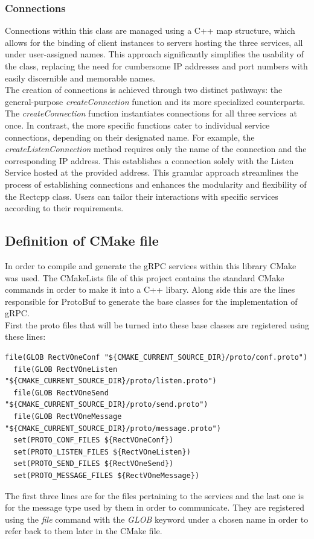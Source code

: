 \subsubsection{Connections}
Connections within this class are managed using a C++ map structure, which allows for the binding of client instances to servers hosting the three services, 
all under user-assigned names. This approach significantly simplifies the usability of the class, replacing the need for cumbersome IP addresses and port 
numbers with easily discernible and memorable names. \\

The creation of connections is achieved through two distinct pathways: the general-purpose \textit{createConnection} function and its more specialized counterparts. 
The \textit{createConnection} function instantiates connections for all three services at once. In contrast, the more specific functions cater to individual service 
connections, depending on their designated name. For example, the \textit{createListenConnection} method requires only the name of the connection and the corresponding 
IP address. This establishes a connection solely with the Listen Service hosted at the provided address. This granular approach streamlines the process of 
establishing connections and enhances the modularity and flexibility of the Rectcpp class. Users can tailor their interactions with specific services according 
to their requirements.

\subsection{Definition of CMake file}
In order to compile and generate the gRPC services within this library CMake was used. The CMakeLists file of this project contains the standard CMake commands 
in order to make it into a C++ libary. Along side this are the lines responsible for ProtoBuf to generate the base classes for the implementation of gRPC. \\
First the proto files that will be turned into these base classes are registered using these lines: 

\begin{minipage}{\textwidth}
\begin{lstlisting}[caption=Excerpt from CMakeLists file of the C++ portion]
  file(GLOB RectVOneConf "${CMAKE_CURRENT_SOURCE_DIR}/proto/conf.proto")
  file(GLOB RectVOneListen "${CMAKE_CURRENT_SOURCE_DIR}/proto/listen.proto")
  file(GLOB RectVOneSend "${CMAKE_CURRENT_SOURCE_DIR}/proto/send.proto")
  file(GLOB RectVOneMessage "${CMAKE_CURRENT_SOURCE_DIR}/proto/message.proto")
  set(PROTO_CONF_FILES ${RectVOneConf})
  set(PROTO_LISTEN_FILES ${RectVOneListen})
  set(PROTO_SEND_FILES ${RectVOneSend})
  set(PROTO_MESSAGE_FILES ${RectVOneMessage})
\end{lstlisting}
\end{minipage}
The first three lines are for the files pertaining to the services and the last one is for the message type used by them in order to communicate. They are registered
using the \textit{file} command with the \textit{GLOB} keyword under a chosen name in order to refer back to them later in the CMake file. \\

